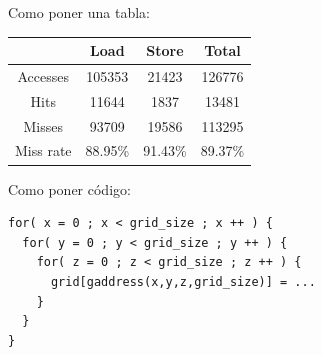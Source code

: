 Como poner una tabla:
\begin{center}
   \begin{tabular}{| c || c | c | c |}
      \hline
      	           & Load	& Store		& Total		\\ \hline \hline
	Accesses   & 105353	& 21423		& 126776	\\ \hline
	Hits       &  11644	&  1837		&  13481	\\ \hline
	Misses     &  93709 	& 19586		& 113295	\\ \hline
	Miss rate  & 88.95\%	& 91.43\%	& 89.37\%	\\ \hline
   \end{tabular}
\end{center}

Como poner c\'{o}digo:

\begin{lstlisting}[]
for( x = 0 ; x < grid_size ; x ++ ) {
  for( y = 0 ; y < grid_size ; y ++ ) {
    for( z = 0 ; z < grid_size ; z ++ ) {
      grid[gaddress(x,y,z,grid_size)] = ...
    }
  }
}
\end{lstlisting}


